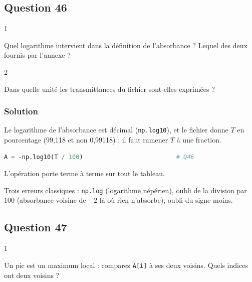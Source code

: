 \documentclass[11pt,a4paper]{article}
\begin{document}
\hypertarget{question-46}{%
\subsection{Question 46}\label{question-46}}

\begin{indication}{1}

Quel logarithme intervient dans la définition de l'absorbance ? Lequel des deux fournis par l'annexe ?

\end{indication}

\begin{indication}{2}

Dans quelle unité les transmittances du fichier sont-elles exprimées ?

\end{indication}

\hypertarget{solution-45}{%
\subsubsection{Solution}\label{solution-45}}

Le logarithme de l'absorbance est décimal (\texttt{np.log10}), et le fichier donne \(T\) en pourcentage (99,118 et non 0,99118) : il faut ramener \(T\) à une fraction.

\begin{lstlisting}[language=Python]
A = -np.log10(T / 100)                          # Q46
\end{lstlisting}

L'opération porte terme à terme sur tout le tableau.

\begin{piege}

Trois erreurs classiques : \texttt{np.log} (logarithme népérien), oubli de la division par 100 (absorbance voisine de \(-2\) là où rien n'absorbe), oubli du signe moins.

\end{piege}

\hypertarget{question-47}{%
\subsection{Question 47}\label{question-47}}

\begin{indication}{1}

Un pic est un maximum local : comparez \texttt{A{[}i{]}} à ses deux voisins. Quels indices ont deux voisins ?

\end{indication}
\end{document}
